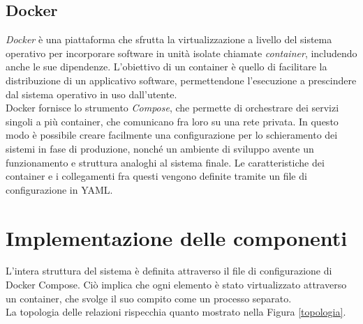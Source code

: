 \subsection{Docker}
\textit{Docker} è una piattaforma che sfrutta la virtualizzazione a livello del sistema operativo per incorporare software 
in unità isolate chiamate \textit{container}, includendo anche le sue dipendenze. L'obiettivo di un container è quello di 
facilitare la distribuzione di un applicativo software, permettendone l'esecuzione a prescindere dal sistema operativo 
in uso dall'utente. 
\\ Docker fornisce lo strumento \textit{Compose}, che permette di orchestrare dei servizi singoli a più container, 
che comunicano fra loro su una rete privata. In questo modo è possibile creare facilmente una configurazione per lo schieramento dei sistemi in fase di produzione, 
nonché un ambiente di sviluppo avente 
un funzionamento e struttura analoghi al sistema finale. Le caratteristiche dei container e i collegamenti fra questi
 vengono definite tramite un file di configurazione in YAML. 


\section{Implementazione delle componenti}
L'intera struttura del sistema è definita attraverso il file di configurazione di Docker Compose. Ciò implica che ogni 
elemento è stato virtualizzato attraverso un container, che svolge il suo compito come un processo separato. 
\\ La topologia delle relazioni rispecchia quanto mostrato nella Figura \ref*{topologia}. 


